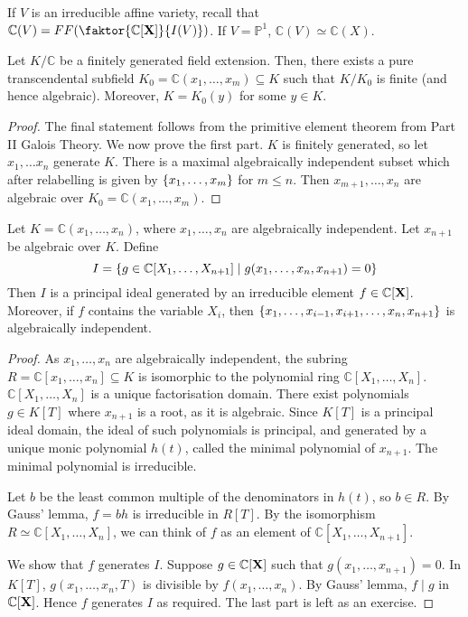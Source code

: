 If \( V \) is an irreducible affine variety, recall that \( \mathbb C(V) = FF\qty(\faktor{\mathbb C[\vb X]}{I(V)}) \).
If \( V = \mathbb P^1 \), \( \mathbb C(V) \simeq \mathbb C(X) \).
\begin{proposition}
    Let \( K / \mathbb C \) be a finitely generated field extension.
    Then, there exists a pure transcendental subfield \( K_0 = \mathbb C(x_1, \dots, x_m) \subseteq K \) such that \( K / K_0 \) is finite (and hence algebraic).
    Moreover, \( K = K_0(y) \) for some \( y \in K \).
\end{proposition}
\begin{proof}
    The final statement follows from the primitive element theorem from Part II Galois Theory.
    We now prove the first part.
    \( K \) is finitely generated, so let \( x_1, \dots x_n \) generate \( K \).
    There is a maximal algebraically independent subset which after relabelling is given by \( \qty{x_1, \dots, x_m} \) for \( m \leq n \).
    Then \( x_{m+1}, \dots, x_n \) are algebraic over \( K_0 = \mathbb C(x_1, \dots, x_m) \).
\end{proof}
\begin{proposition}
    Let \( K = \mathbb C(x_1, \dots, x_n) \), where \( x_1, \dots, x_n \) are algebraically independent.
    Let \( x_{n+1} \) be algebraic over \( K \).
    Define
    \[ I = \qty{g \in \mathbb C[X_1, \dots, X_{n+1}] \mid g(x_1, \dots, x_n, x_{n+1}) = 0} \]
    Then \( I \) is a principal ideal generated by an irreducible element \( f \in \mathbb C[\vb X] \).
    Moreover, if \( f \) contains the variable \( X_i \), then \( \qty{x_1, \dots, x_{i-1}, x_{i+1}, \dots, x_n, x_{n+1}} \) is algebraically independent.
\end{proposition}
\begin{proof}
    As \( x_1, \dots, x_n \) are algebraically independent, the subring \( R = \mathbb C[x_1, \dots, x_n] \subseteq K \) is isomorphic to the polynomial ring \( \mathbb C[X_1, \dots, X_n] \).
    \( \mathbb C[X_1, \dots, X_n] \) is a unique factorisation domain.
    There exist polynomials \( g \in K[T] \) where \( x_{n+1} \) is a root, as it is algebraic.
    Since \( K[T] \) is a principal ideal domain, the ideal of such polynomials is principal, and generated by a unique monic polynomial \( h(t) \), called the minimal polynomial of \( x_{n+1} \).
    The minimal polynomial is irreducible.

    Let \( b \) be the least common multiple of the denominators in \( h(t) \), so \( b \in R \).
    By Gauss' lemma, \( f = bh \) is irreducible in \( R[T] \).
    By the isomorphism \( R \simeq \mathbb C[X_1, \dots, X_n] \), we can think of \( f \) as an element of \( \mathbb C[X_1, \dots, X_{n+1}] \).

    We show that \( f \) generates \( I \).
    Suppose \( g \in \mathbb C[\vb X] \) such that \( g(x_1, \dots, x_{n+1}) = 0 \).
    In \( K[T] \), \( g(x_1, \dots, x_n, T) \) is divisible by \( f(x_1, \dots, x_n) \).
    By Gauss' lemma, \( f \mid g \) in \( \mathbb C[\vb X] \).
    Hence \( f \) generates \( I \) as required.
    The last part is left as an exercise.
\end{proof}
